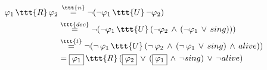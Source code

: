 \documentclass[11pt]{article}
\begin{document}
$\begin{aligned}
     \varphi_1\,\ttt{R}\,\varphi_2 &\,\overset{\ttt{n}}{=} \neg(\neg\varphi_1\,\ttt{U}\,\neg\varphi_2) \\
     &\overset{\ttt{dsc}}{=} \neg(\neg\varphi_1\,\ttt{U}\,(\neg\varphi_2\,\land\,(\neg\varphi_1\,\lor\,sing)))\\
     &\overset{\ttt{t}}{=} \neg(\neg\,\varphi_1\,\ttt{U}\,(\neg\,\varphi_2\,\land\,(\neg\,\varphi_1\,\lor\,sing)\,\land\,alive))\\
     &= \boxed{\varphi_1}\,\ttt{R}\,(\boxed{\varphi_2}\,\lor\,(\boxed{\varphi_1}\,\land\,\neg sing)\,\lor\,\neg alive)
\end{aligned}$
\end{document}
